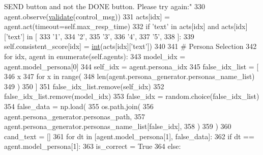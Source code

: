 \begin{DoxyCode}
{       SEND button and not the DONE button. Please try again:"}
330                             agent.observe(\hyperlink{namespaceparlai_1_1core_1_1worlds_afc3fad603b7bce41dbdc9cdc04a9c794}{validate}(control\_msg))
331                             acts[idx] = agent.act(timeout=self.max\_resp\_time)
332                         \textcolor{keywordflow}{if} \textcolor{stringliteral}{'text'} \textcolor{keywordflow}{in} acts[idx] \textcolor{keywordflow}{and} acts[idx][\textcolor{stringliteral}{'text'}] \textcolor{keywordflow}{in} [
333                             \textcolor{stringliteral}{'1'},
334                             \textcolor{stringliteral}{'2'},
335                             \textcolor{stringliteral}{'3'},
336                             \textcolor{stringliteral}{'4'},
337                             \textcolor{stringliteral}{'5'},
338                         ]:
339                             self.consistent\_score[idx] = \hyperlink{namespacelanguage__model_1_1eval__ppl_a7d12ee00479673c5c8d1f6d01faa272a}{int}(acts[idx][\textcolor{stringliteral}{'text'}])
340 
341                     \textcolor{comment}{# Persona Selection}
342                     \textcolor{keywordflow}{for} idx, agent \textcolor{keywordflow}{in} enumerate(self.agents):
343                         model\_idx = agent.model\_persona[0]
344                         self\_idx = agent.persona\_idx
345                         false\_idx\_list = [
346                             x
347                             \textcolor{keywordflow}{for} x \textcolor{keywordflow}{in} range(
348                                 len(agent.persona\_generator.personas\_name\_list)
349                             )
350                         ]
351                         false\_idx\_list.remove(self\_idx)
352                         false\_idx\_list.remove(model\_idx)
353                         false\_idx = random.choice(false\_idx\_list)
354                         false\_data = np.load(
355                             os.path.join(
356                                 agent.persona\_generator.personas\_path,
357                                 agent.persona\_generator.personas\_name\_list[false\_idx],
358                             )
359                         )
360                         cand\_text = []
361                         \textcolor{keywordflow}{for} dt \textcolor{keywordflow}{in} [agent.model\_persona[1], false\_data]:
362                             \textcolor{keywordflow}{if} dt == agent.model\_persona[1]:
363                                 is\_correct = \textcolor{keyword}{True}
364                             \textcolor{keywordflow}{else}:

\end{DoxyCode}
